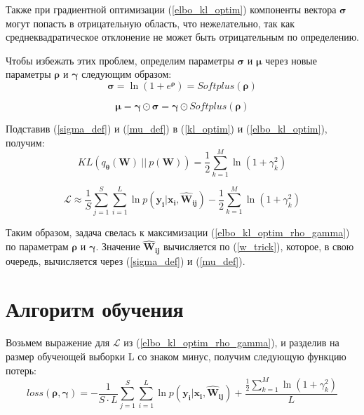 \documentclass{article}
\numberwithin{equation}{section}
\begin{document}
    Также при градиентной оптимизации (\ref{elbo_kl_optim})
    компоненты вектора $\pmb{\sigma}$ могут попасть в отрицательную область,
    что нежелательно, так как среднеквадратическое отклонение
    не может быть отрицательным по определению.

    Чтобы избежать этих проблем,
    определим параметры $\pmb{\sigma}$ и $\pmb{\mu}$
    через новые параметры $\pmb{\rho}$ и $\pmb{\gamma}$
    следующим образом:
    \begin{equation}\label{sigma_def}
        \pmb{\sigma}
        =
            \ln({
                1 + e^{\pmb{\rho}}
            })
        =
            Softplus (\pmb{\rho})
    \end{equation}

    \begin{equation}\label{mu_def}
        \pmb{\mu} = \pmb{\gamma} \odot \pmb{\sigma} = \pmb{\gamma} \odot Softplus (\pmb{\rho})
    \end{equation}

    Подставив (\ref{sigma_def}) и (\ref{mu_def}) в (\ref{kl_optim}) и (\ref{elbo_kl_optim}), получим:
    \begin{equation}\label{kl_optim_rho_gamma}
        KL(q_{\pmb{\theta}}(\pmb{W})~||~p(\pmb{W}))
        =
            \frac{1}{2} \sum_{k=1}^{M} \ln(
                {1 + \gamma_{k}^{2}}
            )
    \end{equation}

    \begin{equation}\label{elbo_kl_optim_rho_gamma}
        \mathcal{L}
        \approx
            \frac{1}{S} \sum_{j=1}^S \sum_{i=1}^{L} {
                \ln{
                    p(\pmb{y_{i}} | \pmb{x_{i}}, \pmb{\hat{W}_{ij}})
                }
            }
        -
            \frac{1}{2} \sum_{k=1}^{M} \ln(
                {1 + \gamma_{k}^{2}}
            )
    \end{equation}

    Таким образом, задача свелась к максимизации (\ref{elbo_kl_optim_rho_gamma})
    по параметрам $\pmb{\rho}$ и $\pmb{\gamma}$.
    Значение $\pmb{\hat{W}_{ij}}$ вычисляется по (\ref{w_trick}),
    которое, в свою очередь, вычисляется через
    (\ref{sigma_def}) и (\ref{mu_def}).

    \section{Алгоритм обучения}
    Возьмем выражение для $\mathcal{L}$ из (\ref{elbo_kl_optim_rho_gamma}),
    и разделив на размер обучеющей выборки L со знаком минус,
    получим следующую функцию потерь:
    \begin{equation}\label{loss_init}
        loss(\pmb{\rho}, \pmb{\gamma})
        =
            - \frac
                {1}
                {S \cdot L}
            \sum_{j=1}^S
            \sum_{i=1}^{L}
                {\ln{
                    p(\pmb{y_{i}} | \pmb{x_{i}}, \pmb{\hat{W}_{ij}})
                }
            }
            +
            \frac
                {
                    \frac{1}{2} \sum_{k=1}^{M} \ln(
                        {1 + \gamma_{k}^{2}}
                    )
                }
                {L}
    \end{equation}
\end{document}
